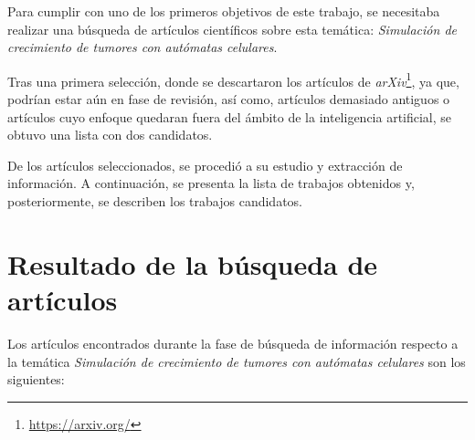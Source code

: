Para cumplir con uno de los primeros objetivos de este trabajo, se necesitaba
realizar una búsqueda de artículos científicos sobre esta temática:
\textit{Simulación de crecimiento de tumores con autómatas celulares}.

Tras una primera selección, donde se descartaron los artículos de \textit{arXiv}\footnote{\url{https://arxiv.org/}},
ya que, podrían estar aún en fase de revisión, así como, artículos demasiado antiguos o artículos
cuyo enfoque quedaran fuera del ámbito de la inteligencia artificial, se obtuvo una lista
con dos candidatos.

De los artículos seleccionados, se procedió a su estudio y extracción de información. A continuación,
se presenta la lista de trabajos obtenidos y, posteriormente, se describen los trabajos candidatos.

\section{Resultado de la búsqueda de artículos}

Los artículos encontrados durante la fase de búsqueda de información respecto a la temática
\textit{Simulación de crecimiento de tumores con autómatas celulares} son los siguientes:

